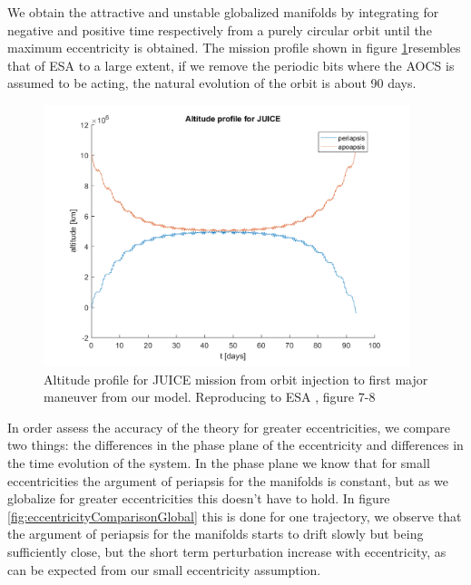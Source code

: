 We obtain the attractive and unstable globalized manifolds by integrating for negative and positive time respectively from a purely circular orbit until the maximum eccentricity is obtained. The mission profile shown in figure \ref{fig:missionProfile}resembles that of ESA to a large extent, if we remove the periodic bits where the AOCS is assumed to be acting, the natural evolution of the orbit is about 90 days.

\begin{figure}[H]
	\centering
	\includegraphics[height=3in]
	{figures/GanymedeESA/missionProfile.png}
	\caption{Altitude profile for JUICE mission from orbit injection to first major maneuver from our model. Reproducing to ESA \cite{esa2011juice}, figure 7-8}
	\label{fig:missionProfile}
\end{figure}

In order assess the accuracy of the theory for greater eccentricities, we compare two things: the differences in the phase plane of the eccentricity and differences in the time evolution of the system. In the phase plane we know that for small eccentricities the argument of periapsis for the manifolds is constant, but as we globalize for greater eccentricities this doesn't have to hold. In figure \ref{fig:eccentricityComparisonGlobal} this is done for one trajectory, we observe that the argument of periapsis for the manifolds starts to drift slowly but being sufficiently close, but the short term perturbation increase with eccentricity, as can be expected from our small eccentricity assumption. 

